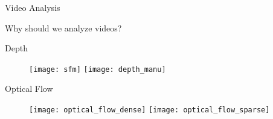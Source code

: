 










\begin{frame}{Video Analysis}

  Why should we analyze videos?

\end{frame}



\begin{frame}{Depth}

  \begin{figure}
    \texttt{[image: sfm]}
    \texttt{[image: depth\_manu]}
  \end{figure}

\end{frame}


\begin{frame}{Optical Flow}

  \begin{figure}
    \texttt{[image: optical\_flow\_dense]}
    \texttt{[image: optical\_flow\_sparse]}
  \end{figure}

\end{frame}


